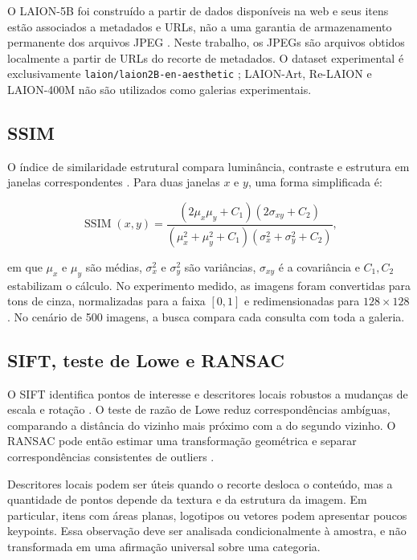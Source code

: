 \documentclass[12pt]{article}
\begin{document}
O LAION-5B foi construído a partir de dados disponíveis na web e seus itens
estão associados a metadados e URLs, não a uma garantia de armazenamento
permanente dos arquivos JPEG \cite{schuhmann2022laion}. Neste trabalho, os
JPEGs são arquivos obtidos localmente a partir de URLs do recorte de
metadados. O dataset experimental é exclusivamente
\texttt{laion/laion2B-en-aesthetic} \cite{laion2022aesthetic,laion2022dataset};
LAION-Art, Re-LAION e LAION-400M não são utilizados como galerias
experimentais.

\subsection{SSIM}

O índice de similaridade estrutural compara luminância, contraste e estrutura
em janelas correspondentes \cite{wang2004ssim}. Para duas janelas $x$ e $y$,
uma forma simplificada é:

\begin{equation}
\operatorname{SSIM}(x,y)=
\frac{(2\mu_x\mu_y+C_1)(2\sigma_{xy}+C_2)}
{(\mu_x^2+\mu_y^2+C_1)(\sigma_x^2+\sigma_y^2+C_2)},
\label{eq:ssim}
\end{equation}

em que $\mu_x$ e $\mu_y$ são médias, $\sigma_x^2$ e $\sigma_y^2$ são
variâncias, $\sigma_{xy}$ é a covariância e $C_1,C_2$ estabilizam o cálculo.
No experimento medido, as imagens foram convertidas para tons de cinza,
normalizadas para a faixa $[0,1]$ e redimensionadas para $128\times128$.
No cenário de 500 imagens, a busca compara cada consulta com toda a galeria.

\subsection{SIFT, teste de Lowe e RANSAC}

O SIFT identifica pontos de interesse e descritores locais robustos a mudanças
de escala e rotação \cite{lowe2004sift}. O teste de razão de Lowe reduz
correspondências ambíguas, comparando a distância do vizinho mais próximo com
a do segundo vizinho. O RANSAC pode então estimar uma transformação geométrica
e separar correspondências consistentes de outliers \cite{fischler1981ransac}.

Descritores locais podem ser úteis quando o recorte desloca o conteúdo, mas a
quantidade de pontos depende da textura e da estrutura da imagem. Em
particular, itens com áreas planas, logotipos ou vetores podem apresentar
poucos keypoints. Essa observação deve ser analisada condicionalmente à
amostra, e não transformada em uma afirmação universal sobre uma categoria.
\end{document}
